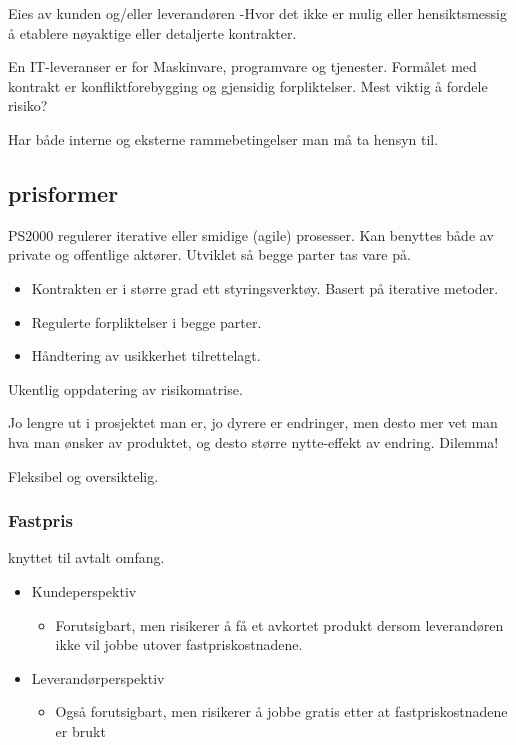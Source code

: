 \documentclass[11pt]{article}
\begin{document}
   Eies av kunden og/eller leverandøren
   -Hvor det ikke er mulig eller hensiktsmessig å etablere nøyaktige eller detaljerte kontrakter.

   En IT-leveranser er for Maskinvare, programvare og tjenester.
   Formålet med kontrakt er konfliktforebygging og gjensidig forpliktelser.
   Mest viktig å fordele risiko?

   Har både interne og eksterne rammebetingelser man må ta hensyn til.
\subsection{prisformer}
\label{sec-11.2}

   PS2000 regulerer iterative eller smidige (agile) prosesser. 
   Kan benyttes både av private og offentlige aktører. Utviklet så begge parter tas vare på.

\begin{itemize}
\item Kontrakten er i større grad ett styringsverktøy. Basert på iterative metoder.
\item Regulerte forpliktelser i begge parter.
\item Håndtering av usikkerhet tilrettelagt.
\end{itemize}

  Ukentlig oppdatering av risikomatrise.

  Jo lengre ut i prosjektet man er, jo dyrere er endringer, 
  men desto mer vet man hva man ønsker av produktet, 
  og desto større nytte-effekt av endring. Dilemma!

  Fleksibel og oversiktelig.
\subsubsection{Fastpris}
\label{sec-11.2.1}

    knyttet til avtalt omfang.
\begin{itemize}
\item Kundeperspektiv

\begin{itemize}
\item Forutsigbart, men risikerer å få et avkortet produkt dersom
        leverandøren ikke vil jobbe utover fastpriskostnadene.
\end{itemize}

\item Leverandørperspektiv

\begin{itemize}
\item Også forutsigbart, men risikerer å jobbe gratis etter at 
        fastpriskostnadene er brukt
\end{itemize}

\end{itemize}
\end{document}
